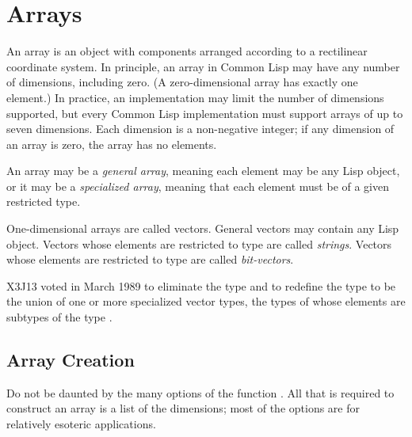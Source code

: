 
\clearpage\def\pagestatus{FINAL PROOF}

\chapter{Arrays}

An array is an object with components arranged according
to a rectilinear coordinate system.
In principle, an
array in Common Lisp may have any number of dimensions, including zero.
(A zero-dimensional array has exactly one element.)
In practice, an implementation may limit the number of dimensions
supported, but
every Common Lisp implementation must support arrays of up to
seven dimensions.
Each dimension is a non-negative integer; if any dimension of an array is zero,
the array has no elements.

An array may be a {\it general array}, meaning each element may be any Lisp
object, or it may be a {\it specialized array}, meaning that each element
must be of a given restricted type.

\begin{obsolete}
One-dimensional arrays are called vectors.  General vectors may contain
any Lisp object.  Vectors whose elements are restricted to type
 are called {\it strings}.  Vectors whose elements are
restricted to type  are called {\it bit-vectors}.
\end{obsolete}

\begin{newer}
X3J13 voted in March 1989 
to eliminate the type  and to redefine the type
 to be the union of one or more specialized vector
types, the types of whose elements are subtypes of the type .
\end{newer}

\section{Array Creation}

Do not be daunted by the many options of the function .
All that is required to construct an array is a list of
the dimensions; most of the options are for relatively esoteric
applications.

